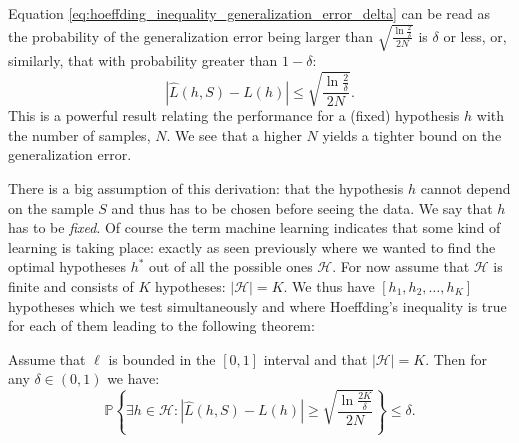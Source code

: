 Equation \eqref{eq:hoeffding_inequality_generalization_error_delta} can be read as the probability of the generalization error being larger than $\sqrt{\frac{\ln \frac{2}{\delta}}{2N}}$ is $\delta$ or less, or, similarly, that with probability greater than $1-\delta$:
\begin{equation}
  \label{eq:hoeffding_inequality_single_PAC}
  \left| \hat{L}(h, S) - L(h) \right| \leq \sqrt{\frac{\ln \frac{2}{\delta}}{2N}}.
\end{equation}
This is a powerful result relating the performance for a (fixed) hypothesis $h$ with the number of samples, $N$. We see that a higher $N$ yields a tighter bound on the generalization error.

There is a big assumption of this derivation: that the hypothesis $h$ cannot depend on the sample $S$ and thus has to be chosen before seeing the data. We say that $h$ has to be \emph{fixed}. Of course the term machine learning indicates that some kind of learning is taking place: exactly as seen previously where we wanted to find the optimal hypotheses $h^*$ out of all the possible ones $\mathcal{H}$. For now assume that $\mathcal{H}$ is finite and consists of $K$ hypotheses: $|\mathcal{H}| = K$. We thus have $[h_1, h_2, \dots, h_K]$ hypotheses which we test simultaneously and where Hoeffding's inequality is true for each of them leading to the following theorem:
\begin{theorem}
  \label{theorem:hoeffding_finite}
  Assume that $\ell$ is bounded in the $[0, 1]$ interval and that $|\mathcal{H}| = K$. Then for any $\delta\in(0,1)$ we have:  
  \begin{equation}
    \label{eq:hoeffding_inequality_theorem_multiple}
    \mathbb{P} \left\{ \exists h \in \mathcal{H}: \left| \hat{L}(h, S) - L(h) \right| \geq \sqrt{\frac{\ln \frac{2K}{\delta}}{2N}}  \right\} \leq \delta.
  \end{equation}
\end{theorem}

